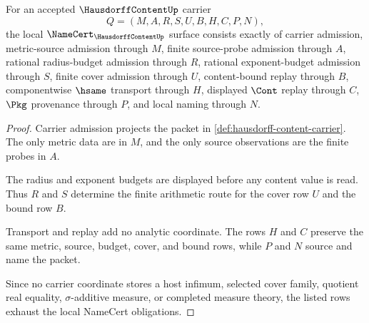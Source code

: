 \begin{theorem}
\label{thm:hausdorff-content-namecert-obligations}
For an accepted $\HausdorffContentUp$ carrier
$$
Q=(M,A,R,S,U,B,H,C,P,N),
$$
the local $\NameCert_{\HausdorffContentUp}$ surface consists exactly of carrier admission, metric-source admission through $M$, finite source-probe admission through $A$, rational radius-budget admission through $R$, rational exponent-budget admission through $S$, finite cover admission through $U$, content-bound replay through $B$, componentwise $\hsame$ transport through $H$, displayed $\Cont$ replay through $C$, $\Pkg$ provenance through $P$, and local naming through $N$.
\end{theorem}
\begin{proof}
Carrier admission projects the packet in \autoref{def:hausdorff-content-carrier}. The only metric data are in $M$, and the only source observations are the finite probes in $A$.

The radius and exponent budgets are displayed before any content value is read. Thus $R$ and $S$ determine the finite arithmetic route for the cover row $U$ and the bound row $B$.

Transport and replay add no analytic coordinate. The rows $H$ and $C$ preserve the same metric, source, budget, cover, and bound rows, while $P$ and $N$ source and name the packet.

Since no carrier coordinate stores a host infimum, selected cover family, quotient real equality, $\sigma$-additive measure, or completed measure theory, the listed rows exhaust the local NameCert obligations.
\end{proof}

